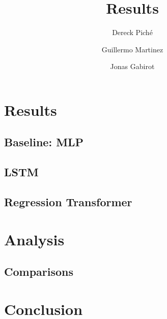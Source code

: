 \documentclass{article}
\title{Results}
\author
{
    Dereck Piché \and
    Guillermo Martinez \and
    Jonas Gabirot \and
}
\begin{document}
\maketitle

\section{Results}

\subsection{Baseline: MLP}

\subsection{LSTM}

\subsection{Regression Transformer}


\section{Analysis}

\subsection{Comparisons}

\section{Conclusion}



\end{document}
